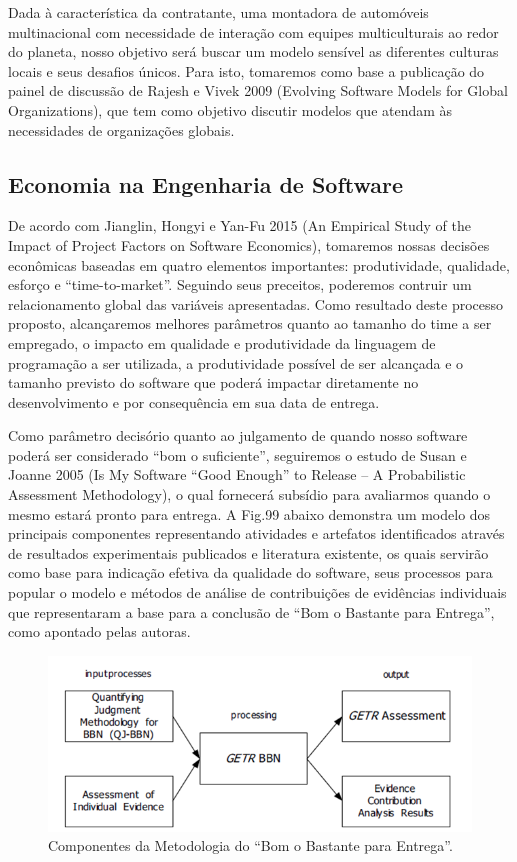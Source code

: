 \documentclass[12pt]{article}
\begin{document}
Dada à característica da contratante, uma montadora de automóveis multinacional com necessidade de interação com equipes multiculturais ao redor do planeta, nosso objetivo será buscar um modelo sensível as diferentes culturas locais e seus desafios únicos. Para isto, tomaremos como base a publicação do painel de discussão de Rajesh e Vivek 2009 (Evolving Software Models for Global Organizations), que tem como objetivo discutir modelos que atendam às necessidades de organizações globais.

\subsection{Economia na Engenharia de Software}

De acordo com Jianglin, Hongyi e Yan-Fu 2015 (An Empirical Study of the Impact of Project Factors on Software Economics), tomaremos nossas decisões econômicas baseadas em quatro elementos importantes: produtividade, qualidade, esforço e “time-to-market”. Seguindo seus preceitos, poderemos contruir um relacionamento global das variáveis apresentadas. Como resultado deste processo proposto, alcançaremos melhores parâmetros quanto ao tamanho do time a ser empregado, o impacto em qualidade e produtividade da linguagem de programação a ser utilizada, a produtividade possível de ser alcançada e o tamanho previsto do software que poderá impactar diretamente no desenvolvimento e por consequência em sua data de entrega.

Como parâmetro decisório quanto ao julgamento de quando nosso software poderá ser considerado “bom o suficiente”, seguiremos o estudo de Susan e Joanne 2005 (Is My Software “Good Enough” to Release – A Probabilistic Assessment Methodology), o qual fornecerá subsídio para avaliarmos quando o mesmo estará pronto para entrega. A Fig.99 abaixo demonstra um modelo dos principais componentes representando atividades e artefatos identificados através de resultados experimentais publicados e literatura existente, os quais servirão como base para indicação efetiva da qualidade do software, seus processos para popular o modelo e métodos de análise de contribuições de evidências individuais que representaram a base para a conclusão de “Bom o Bastante para Entrega”, como apontado pelas autoras.

\begin{figure}[htp]
\centering
\includegraphics[scale=.8] {swebok_economia.png}
\caption{Componentes da Metodologia do “Bom o Bastante para Entrega”.}
\label{fig:exampleFig6}
\end{figure}




%
%
\end{document}
